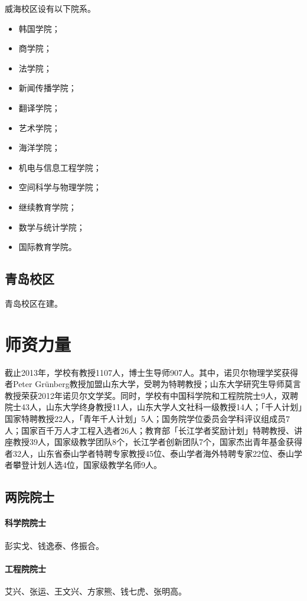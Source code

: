 \documentclass{sduthesis}
\begin{document}
威海校区设有以下院系。

\begin{itemize}
  \item 韩国学院；
  \item 商学院；
  \item 法学院；
  \item 新闻传播学院；
  \item 翻译学院；
  \item 艺术学院；
  \item 海洋学院；
  \item 机电与信息工程学院；
  \item 空间科学与物理学院；
  \item 继续教育学院；
  \item 数学与统计学院；
  \item 国际教育学院。
\end{itemize}

\subsection{青岛校区}

青岛校区在建。

\section{师资力量}

截止2013年，学校有教授1107人，博士生导师907人。其中，诺贝尔物理学奖获得者Peter Grünberg教授加盟山东大学，受聘为特聘教授；山东大学研究生导师莫言教授荣获2012年诺贝尔文学奖。同时，学校有中国科学院和工程院院士9人，双聘院士43人，山东大学终身教授11人，山东大学人文社科一级教授14人；「千人计划」国家特聘教授22人，「青年千人计划」5人；国务院学位委员会学科评议组成员7人；国家百千万人才工程入选者26人；教育部「长江学者奖励计划」特聘教授、讲座教授39人，国家级教学团队8个，长江学者创新团队7个，国家杰出青年基金获得者32人，山东省泰山学者特聘专家教授45位、泰山学者海外特聘专家22位、泰山学者攀登计划人选4位，国家级教学名师9人。

\subsection{两院院士}

\paragraph{科学院院士}彭实戈、钱逸泰、佟振合。

\paragraph{工程院院士}艾兴、张运、王文兴、方家熊、钱七虎、张明高。
\end{document}
